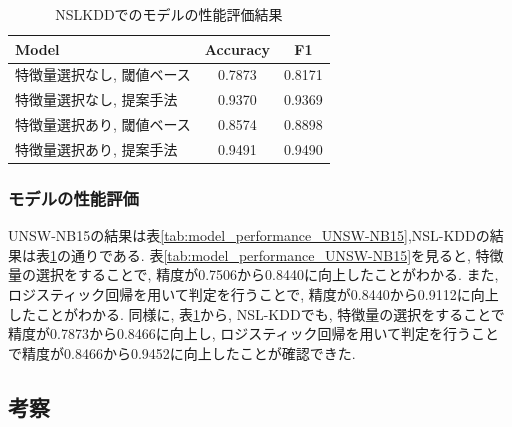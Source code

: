 \documentclass{css}
\begin{document}
\begin{table}[ht]
    \caption{NSLKDDでのモデルの性能評価結果}
    \centering
    \footnotesize
    \begin{tabular}{lcc}
        \hline\hline
        Model & Accuracy & F1 \\
        \hline
        特徴量選択なし, 閾値ベース& 0.7873 & 0.8171 \\
        特徴量選択なし, 提案手法 & 0.9370 & 0.9369 \\ 
        特徴量選択あり, 閾値ベース& 0.8574 & 0.8898 \\
        特徴量選択あり, 提案手法 & 0.9491 & 0.9490 \\
        \hline
    \end{tabular}
    \label{tab:model_performance_NSL-KDD}
\end{table}

\subsubsection{モデルの性能評価}
UNSW-NB15の結果は表\ref{tab:model_performance_UNSW-NB15},NSL-KDDの結果は表\ref{tab:model_performance_NSL-KDD}の通りである. 表\ref{tab:model_performance_UNSW-NB15}を見ると, 特徴量の選択をすることで, 精度が0.7506から0.8440に向上したことがわかる. また, ロジスティック回帰を用いて判定を行うことで, 精度が0.8440から0.9112に向上したことがわかる. 同様に, 表\ref{tab:model_performance_NSL-KDD}から, NSL-KDDでも, 特徴量の選択をすることで精度が0.7873から0.8466に向上し, ロジスティック回帰を用いて判定を行うことで精度が0.8466から0.9452に向上したことが確認できた. 

\subsection{考察}
\end{document}
